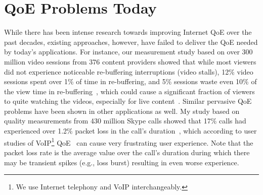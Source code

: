 \section{QoE Problems Today}

While there has been intense research towards improving Internet 
QoE over the past decades, existing approaches, however, have failed 
to deliver the QoE needed by today's applications. 
For instance, our measurement study based on over 300 million 
video sessions from 376 content providers showed that
while most viewers did not experience noticeable re-buffering interruptions
(video stalls), 12\% video sessions spent over 1\% of time in re-buffering,
and 5\% sessions waste even 10\% of the view time in 
re-buffering~\cite{jiang2013shedding}, which could cause a significant 
fraction of viewers to quite watching the videos, especially for 
live content~\cite{sigcomm11}. 
Similar pervasive QoE problems have been
shown in other applications as well. 
My study based on quality measurements from 430 million 
Skype calls showed that 17\% calls had experienced over 
1.2\% packet loss in the call's duration~\cite{via}, which 
according to user studies of VoIP\footnote{We use Internet telephony 
and VoIP interchangeably.} QoE~\cite{itu,cisco-voip} 
can cause very frustrating user experience.
Note that the packet loss rate is the average value over the
call's duration during which there may be transient spikes
(e.g., loss burst) resulting in even worse experience.



